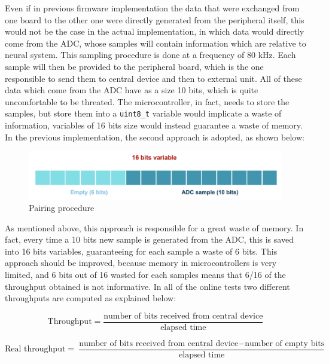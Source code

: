 \documentclass{Configuration_Files/PoliMi3i_thesis}
\begin{document}
Even if in previous firmware implementation the data that were exchanged from one board to the other one were directly generated from the peripheral itself, this would not be the case in the actual implementation, in which data would directly come from the ADC, whose samples will contain information which are relative to neural system. This sampling procedure is done at a frequency of 80 kHz. Each sample will then be provided to the peripheral board, which is the one responsible to send them to central device and then to external unit. All of these data which come from the ADC have as a size 10 bits, which is quite uncomfortable to be threated. The microcontroller, in fact, needs to store the samples, but store them into a \texttt{uint8\_t} variable would implicate a waste of information, variables of 16 bits size would instead guarantee a waste of memory. In the previous implementation, the second approach is adopted, as shown below:


\begin{figure}[H]
    \centering
    \includegraphics[scale=0.7]{Shift Algorithm/Screenshot 2024-07-22 at 22.31.12.png}
    \caption{Pairing procedure}
    \label{pairing_procedure}
\end{figure}


As mentioned above, this approach is responsible for a great waste of memory. In fact, every time a 10 bits new sample is generated from the ADC, this is saved into 16 bits variables, guaranteeing for each sample a waste of 6 bits. This approach should be improved, because memory in microcontrollers is very limited, and 6 bits out of 16 wasted for each samples means that 6/16 of the throughput obtained is not informative. In all of the online tests two different throughputs are computed as explained below:

\[
\text{Throughput} = \frac{\text{number of bits received from central device}}{\text{elapsed time}}
\]

\[
\text{Real throughput} = \frac{\text{number of bits received from central device} - \text{number of empty bits}}{\text{elapsed time}}
\]
\end{document}
